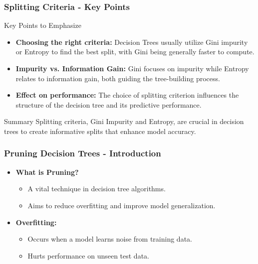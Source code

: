 \documentclass[aspectratio=169]{beamer}
\begin{document}
\begin{frame}[fragile]
  \frametitle{Splitting Criteria - Key Points}
  \begin{block}{Key Points to Emphasize}
    \begin{itemize}
      \item \textbf{Choosing the right criteria:} Decision Trees usually utilize Gini impurity or Entropy to find the best split, with Gini being generally faster to compute.
      \item \textbf{Impurity vs. Information Gain:} Gini focuses on impurity while Entropy relates to information gain, both guiding the tree-building process.
      \item \textbf{Effect on performance:} The choice of splitting criterion influences the structure of the decision tree and its predictive performance.
    \end{itemize}
  \end{block}

  \begin{block}{Summary}
    Splitting criteria, Gini Impurity and Entropy, are crucial in decision trees to create informative splits that enhance model accuracy.
  \end{block}
\end{frame}

\begin{frame}[fragile]
    \frametitle{Pruning Decision Trees - Introduction}
    \begin{itemize}
        \item \textbf{What is Pruning?}
        \begin{itemize}
            \item A vital technique in decision tree algorithms.
            \item Aims to reduce overfitting and improve model generalization.
        \end{itemize}
        \item \textbf{Overfitting:}
        \begin{itemize}
            \item Occurs when a model learns noise from training data.
            \item Hurts performance on unseen test data.
        \end{itemize}
    \end{itemize}
\end{frame}
\end{document}
